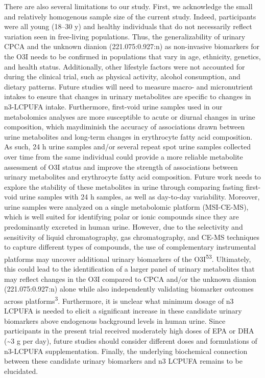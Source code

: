 \documentclass[journal=jacsat,manuscript=article]{achemso}
\begin{document}
There are also several limitations to our study. First, we acknowledge
the small and relatively homogenous sample size of the current study.
Indeed, participants were all young (18--30 y) and healthy individuals
that do not necessarily reflect variation seen in free-living
populations. Thus, the generalizability of urinary CPCA and the unknown
dianion (221.075:0.927:n) as non-invasive biomarkers for the O3I needs
to be confirmed in populations that vary in age, ethnicity, genetics,
and health status. Additionally, other lifestyle factors were not
accounted for during the clinical trial, such as physical activity,
alcohol consumption, and dietary patterns. Future studies will need to
measure macro- and micronutrient intakes to ensure that changes in
urinary metabolites are specific to changes in n3-LCPUFA intake.
Furthermore, first-void urine samples used in our metabolomics analyses
are more susceptible to acute or diurnal changes in urine composition,
which maydiminish the accuracy of associations drawn between urine
metabolites and long-term changes in erythrocyte fatty acid composition.
As such, 24 h urine samples and/or several repeat spot urine samples
collected over time from the same individual could provide a more
reliable metabolite assessment of O3I status and improve the strength of
associations between urinary metabolites and erythrocyte fatty acid
composition. Future work needs to explore the stability of these
metabolites in urine through comparing fasting first-void urine samples
with 24 h samples, as well as day-to-day variability. Moreover, urine
samples were analyzed on a single metabolomic platform (MSI-CE-MS),
which is well suited for identifying polar or ionic compounds since they
are predominantly excreted in human urine. However, due to the
selectivity and sensitivity of liquid chromatography, gas
chromatography, and CE-MS techniques to capture different types of
compounds, the use of complementary instrumental platforms may uncover
additional urinary biomarkers of the O3I\textsuperscript{53}.
Ultimately, this could lead to the identification of a larger panel of
urinary metabolites that may reflect changes in the O3I compared to CPCA
and/or the unknown dianion (221.075:0.927:n) alone while also
independently validating biomarker outcomes across
platforms\textsuperscript{3}. Furthermore, it is unclear what minimum
dosage of n3 LCPUFA is needed to elicit a significant increase in these
candidate urinary biomarkers above endogenous background levels in human
urine. Since participants in the present trial received moderately high
doses of EPA or DHA (\textasciitilde3 g per day), future studies should
consider different doses and formulations of n3-LCPUFA supplementation.
Finally, the underlying biochemical connection between these candidate
urinary biomarkers and n3 LCPUFA remains to be elucidated.
\end{document}
